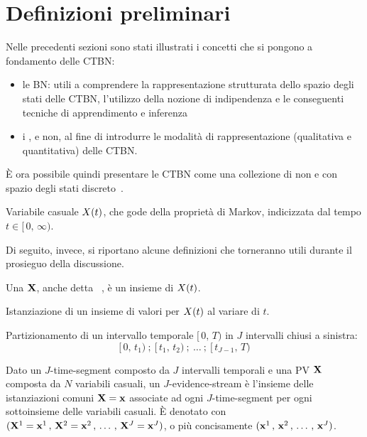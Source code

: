 \section{Definizioni preliminari}
\label{sec:Definizioni preliminari}
Nelle precedenti sezioni sono stati illustrati i concetti che si pongono a fondamento delle \acl{CTBN}:
\begin{itemize}
    \item le \acl{BN}: utili a comprendere la rappresentazione strutturata dello spazio degli stati delle \acs{CTBN}, l'utilizzo della nozione di indipendenza \cond*{} e le conseguenti tecniche di apprendimento e inferenza
    \item i \mprocess{}, \omog{} e non, al fine di introdurre le modalità di rappresentazione (qualitativa e quantitativa) delle \acs{CTBN}.
\end{itemize}

\`E ora possibile quindi presentare le \acl{CTBN} come una collezione di \ctmp{} non \omog{} e con spazio degli stati discreto~\cite{Nodelman2002}.

\begin{definizione}
Variabile casuale $\mathnormal{X}(t)$, che gode della proprietà di Markov, indicizzata dal tempo $t\in[\,0,\,\infty)$.
\end{definizione}

Di seguito, invece, si riportano alcune definizioni che torneranno utili durante il prosieguo della discussione.

\begin{definizione}[\acl{PV}]
    Una \pv{} $\mathbf{X}$, anche detta ~\cite{Nodelman2007}, è un insieme di \ctmp{} $\mathnormal{X}(t)$.
\end{definizione}

\begin{definizione}[Traiettoria]
    Istanziazione di un insieme di valori per $\mathnormal{X}(t)$ al variare di $t$.
\end{definizione}

\begin{definizione}
Partizionamento di un intervallo temporale $[\,0,\,T)$ in $J$ intervalli chiusi a sinistra:
\[
[\,0,\,t_1)\:;\:[\,t_1,\,t_2)\:;\:\dotsc\:;\:[\,t_{J-1},\,T)
\]
\end{definizione}

\begin{definizione}
Dato un $J$-time-segment composto da $J$ intervalli temporali e una \acl{PV} $\mathbf{X}$ composta da $N$ variabili casuali, un $J$-evidence-stream è l'insieme delle istanziazioni comuni $\mathbf{X}=\mathbf{x}$ associate ad ogni $J$-time-segment per ogni sottoinsieme delle variabili casuali. \`E denotato con $(\mathbf{X}^1=\mathbf{x}^1\,,\,\mathbf{X}^2=\mathbf{x}^2\,,\,\dotsc\,,\,\mathbf{X}^J=\mathbf{x}^J)$, o più concisamente $(\mathbf{x}^1\,,\,\mathbf{x}^2\,,\,\dotsc\,,\,\mathbf{x}^J)$.
\end{definizione}

